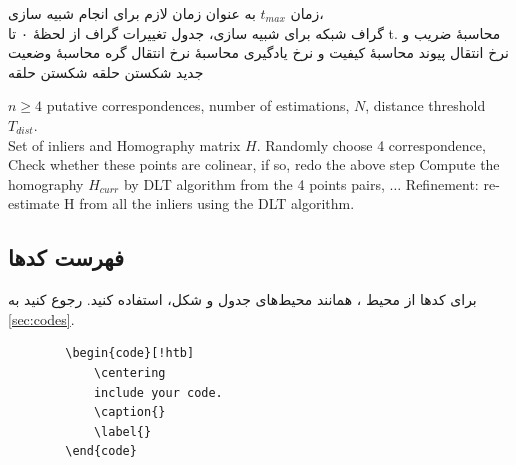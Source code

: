 \begin{algorithm}[!htb]
	\caption{اجرای برنامهٔ شبیه‌سازی}
	\label{alg:simulation-random}
	\begin{algorithmic}[1]
		\REQUIRE زمان $t_{max}$ به عنوان زمان لازم برای انجام شبیه سازی،\\
		\REQUIRE  گراف شبکه برای شبیه سازی،
		\ENSURE جدول تغییرات گراف از لحظهٔ ۰ تا t.
		\STATE محاسبهٔ ضریب و نرخ انتقال پیوند
		\STATE محاسبهٔ کیفیت و نرخ یادگیری
		\ENDFOR
		\STATE محاسبهٔ نرخ انتقال گره
		\STATE محاسبهٔ وضعیت جدید
		\ENDFOR
		\STATE شکستن حلقه
		\STATE شکستن حلقه
		\ENDIF
		\ENDFOR
	\end{algorithmic}
\end{algorithm}

\begin{algorithm}[!htb]
	\caption{ برای تخمین ماتریس هوموگرافی}
	\label{alg:RANSAC}
	\begin{latin}
		\begin{algorithmic}[1]
			\REQUIRE $n\geq4$ putative correspondences, number of estimations, $N$, distance threshold $T_{dist}$.\\
			\ENSURE Set of inliers and Homography matrix $H$.
			\STATE Randomly choose 4 correspondence,
			\STATE Check whether these points are colinear, if so, redo the above step
			\STATE Compute the homography $H_{curr}$ by DLT algorithm from the 4 points pairs,
			\STATE $\ldots$ %
			\ENDFOR
			\STATE Refinement: re-estimate H from all the inliers using the DLT algorithm.
		\end{algorithmic}
	\end{latin}
\end{algorithm}

\subsection{فهرست کدها}
برای کدها از محیط
،
همانند محیط‌های جدول و شکل، استفاده کنید. رجوع کنید به
\autoref{sec:codes}.
\begin{latin}
	\begin{verbatim}
		\begin{code}[!htb]
		    \centering
		    include your code.
		    \caption{}
		    \label{}
		\end{code}
	\end{verbatim}
\end{latin}

